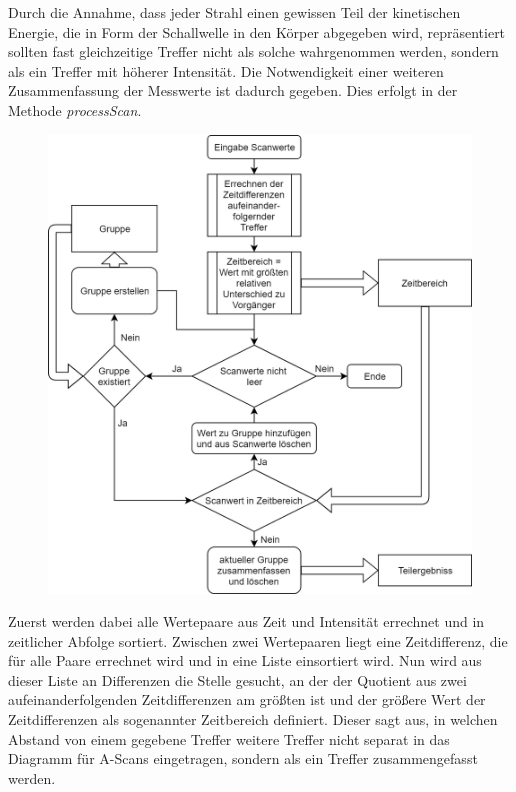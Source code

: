 \documentclass[reducespace,stylepage,semiarbeit]{spezidoc}
\begin{document}
Durch die Annahme, dass jeder Strahl einen gewissen Teil der kinetischen Energie, die in Form der Schallwelle in den Körper abgegeben wird, repräsentiert sollten fast gleichzeitige Treffer nicht als solche wahrgenommen werden, sondern als ein Treffer mit höherer Intensität. %
Die Notwendigkeit einer weiteren Zusammenfassung der Messwerte ist dadurch gegeben. 
Dies erfolgt in der Methode \textsl{processScan}. \par %
\begin{figure}
\includegraphics[scale=0.3]{pictures/Flowchart_processScan.png}
\end{figure}  %
Zuerst werden dabei alle Wertepaare aus Zeit und Intensität errechnet und in zeitlicher Abfolge sortiert. 
Zwischen zwei Wertepaaren liegt eine Zeitdifferenz, die für alle Paare errechnet wird und in eine Liste einsortiert wird.
Nun wird aus dieser Liste an Differenzen die Stelle gesucht, an der der Quotient aus zwei aufeinanderfolgenden Zeitdifferenzen am größten ist und der größere Wert der Zeitdifferenzen als sogenannter Zeitbereich definiert. 
Dieser sagt aus, in welchen Abstand von einem gegebene Treffer weitere Treffer nicht separat in das Diagramm für A-Scans eingetragen, sondern als ein Treffer zusammengefasst werden.\\
\end{document}
